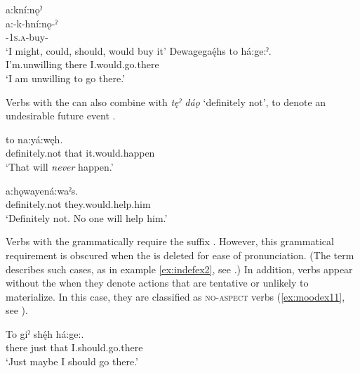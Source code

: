 \ea\label{ex:moodex7} 

\ea a:kní:nǫˀ\\
\gll a:-k-hní:nǫ-ˀ\\
{\indefinite}-\textsc{1s.a}-buy-{\punctual}\\
\glt `I might, could, should, would buy it'
\ex
\gll Dewagegaę́hs to há:ge:ˀ.\\
I’m.unwilling there I.would.go.there\\
\glt ‘I am unwilling to go there.’ 
\z
\z

Verbs with the  {\indefinite} can also combine with \textit{tęˀ dáǫ} ‘definitely not’, to denote an undesirable future event .

\ea\label{ex:indefex2} 
\ea
{} to na:yá:węh.\\
definitely.not that it.would.happen\\
\glt ‘That will \emph{never} happen.’ 
\clearpage

\ex
{} a:hǫwayená:waˀs. \\
definitely.not  they.would.help.him\\
\glt ‘Definitely not. No one will help him.’ 
\z
\z


Verbs with the  {\indefinite} grammatically require the  {\punctual} suffix . However, this grammatical requirement is obscured when the  {\punctual} is deleted for ease of pronunciation. (The term \textsc{\zeropunctual} describes such cases, as in example \ref{ex:indefex2}, see .) In addition,  {\indefinite} verbs appear without the  {\punctual} when they denote actions that are tentative or unlikely to materialize. In this case, they are classified as \textsc{no-aspect} verbs (\ref{ex:moodex11}, see ).

\ea\label{ex:moodex11}
\gll To giˀ shę́h há:ge:.\\
there just that I.should.go.there\\
\glt ‘Just maybe I should go there.’ 
\z



